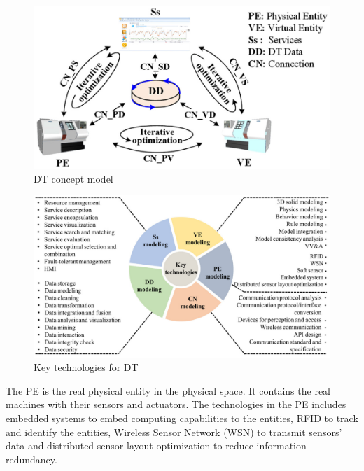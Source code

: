\documentclass[article,table]{aaltoseries}
\begin{document}
\begin{figure}[t!]
	\begin{center}
		\includegraphics[width=1\textwidth]{figures/Tao_DT_concept_model}
		\caption{DT concept model \cite{Tao2019}}
		\label{fig:Tao_DT_concept_model}
	\end{center}
\end{figure}

\begin{figure}[t!]
	\begin{center}
		\includegraphics[width=1\textwidth]{figures/Tao_DT_key_techs}
		\caption{Key technologies for DT \cite{Tao2019}}
		\label{fig:Tao_DT_key_techs}
	\end{center}
\end{figure}

The PE is the real physical entity in the physical space. It contains the real machines with their sensors and actuators. The technologies in the PE includes embedded systems to embed computing capabilities to the entities, RFID to track and identify the entities, Wireless Sensor Network (WSN) to transmit sensors' data and distributed sensor layout optimization to reduce information redundancy.
\end{document}
